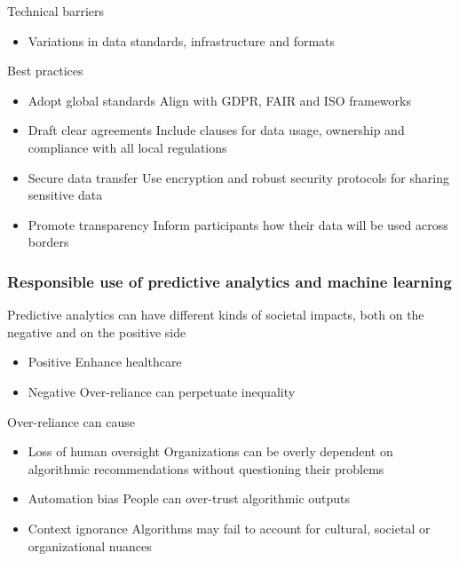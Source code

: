 Technical barriers
\begin{itemize}
    \item Variations in data standards, infrastructure and formats
\end{itemize}

Best practices
\begin{itemize}
    \item Adopt global standards \ra Align with GDPR, FAIR and ISO frameworks
    \item Draft clear agreements \ra Include clauses for data usage, ownership and compliance with all local regulations
    \item Secure data transfer \ra Use encryption and robust security protocols for sharing sensitive data 
    \item Promote transparency \ra Inform participants how their data will be used across borders
\end{itemize}





























\subsubsection{Responsible use of predictive analytics and machine learning}

Predictive analytics can have different kinds of societal impacts, both on the negative and on the positive side

\begin{itemize}
    \item Positive \ra Enhance healthcare
    \item Negative \ra Over-reliance can perpetuate inequality
\end{itemize}


Over-reliance can cause
\begin{itemize}
    \item Loss of human oversight \ra Organizations can be overly dependent on algorithmic recommendations without questioning their problems
    \item Automation bias \ra People can over-trust algorithmic outputs
    \item Context ignorance \ra Algorithms may fail to account for cultural, societal or organizational nuances
\end{itemize}

